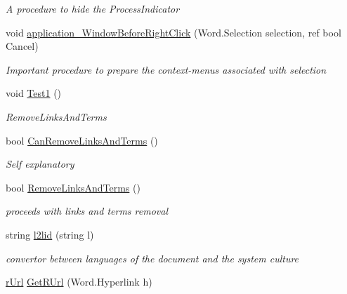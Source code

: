 \begin{DoxyCompactItemize}
\begin{DoxyCompactList}\small\item\em A procedure to hide the Process\+Indicator \end{DoxyCompactList}\item 
void \hyperlink{class_e_u_cases_1_1_e_u_links_checker_word_add_in_1_1_e_u_links_checker_add_in_a21e5fc94c83666d79e915bb3b4181b36}{application\+\_\+\+Window\+Before\+Right\+Click} (Word.\+Selection selection, ref bool Cancel)
\begin{DoxyCompactList}\small\item\em Important procedure to prepare the context-\/menus associated with selection \end{DoxyCompactList}\item 
void \hyperlink{class_e_u_cases_1_1_e_u_links_checker_word_add_in_1_1_e_u_links_checker_add_in_a2ca64f7f579a1de158647542f82dd499}{Test1} ()
\begin{DoxyCompactList}\small\item\em Remove\+Links\+And\+Terms \end{DoxyCompactList}\item 
bool \hyperlink{class_e_u_cases_1_1_e_u_links_checker_word_add_in_1_1_e_u_links_checker_add_in_aa2633866e355d5fc6041ba15d03b3562}{Can\+Remove\+Links\+And\+Terms} ()
\begin{DoxyCompactList}\small\item\em Self explanatory \end{DoxyCompactList}\item 
bool \hyperlink{class_e_u_cases_1_1_e_u_links_checker_word_add_in_1_1_e_u_links_checker_add_in_a21773ba6202f514dd28424ef74995c73}{Remove\+Links\+And\+Terms} ()
\begin{DoxyCompactList}\small\item\em proceeds with links and terms removal \end{DoxyCompactList}\item 
string \hyperlink{class_e_u_cases_1_1_e_u_links_checker_word_add_in_1_1_e_u_links_checker_add_in_ab973748eb34ec3ddfcfa245a0fca6184}{l2lid} (string l)
\begin{DoxyCompactList}\small\item\em convertor between languages of the document and the system culture \end{DoxyCompactList}\item 
\hyperlink{class_e_u_cases_1_1_e_u_links_checker_word_add_in_1_1_e_u_links_checker_add_in_1_1r_url}{r\+Url} \hyperlink{class_e_u_cases_1_1_e_u_links_checker_word_add_in_1_1_e_u_links_checker_add_in_a80d48af6300535542c0fa5c0f40226c2}{Get\+R\+Url} (Word.\+Hyperlink h)

\end{DoxyCompactItemize}
